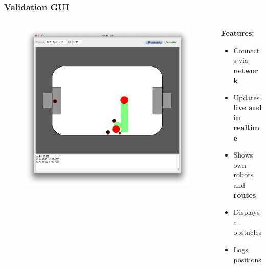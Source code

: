 \documentclass[hyperref={pdfpagelabels=false}]{beamer}
\begin{document}
\begin{frame}
    \frametitle{Validation GUI}
    \begin{columns}[T]
        \begin{column}{0.4\textwidth}
            \begin{figure}
                \center
                \includegraphics[width=\textwidth]{Pictures/gui-1}
            \end{figure}
        \end{column}
        \begin{column}{0.6\textwidth}
            \textbf{Features:}
            \begin{itemize}
                \item Connects via \textbf{network}
                \item Updates \textbf{live and in realtime}
                \item Shows own robots and \textbf{routes}
                \item Displays all obstacles
                \item Logs positions
            \end{itemize}
        \end{column}
    \end{columns}
\end{frame}
\end{document}
